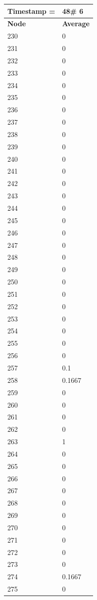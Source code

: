 \begin{tabular}{|l||l|}
\hline
\textbf{Timestamp =} & \textbf{48}\# 6\\\hline
	\textbf{Node} & \textbf{Average} \\ \hline
\hline
	230 & 0 \\ \hline
	231 & 0 \\ \hline
	232 & 0 \\ \hline
	233 & 0 \\ \hline
	234 & 0 \\ \hline
	235 & 0 \\ \hline
	236 & 0 \\ \hline
	237 & 0 \\ \hline
	238 & 0 \\ \hline
	239 & 0 \\ \hline
	240 & 0 \\ \hline
	241 & 0 \\ \hline
	242 & 0 \\ \hline
	243 & 0 \\ \hline
	244 & 0 \\ \hline
	245 & 0 \\ \hline
	246 & 0 \\ \hline
	247 & 0 \\ \hline
	248 & 0 \\ \hline
	249 & 0 \\ \hline
	250 & 0 \\ \hline
	251 & 0 \\ \hline
	252 & 0 \\ \hline
	253 & 0 \\ \hline
	254 & 0 \\ \hline
	255 & 0 \\ \hline
	256 & 0 \\ \hline
	257 & 0.1 \\ \hline
	258 & 0.1667 \\ \hline
	259 & 0 \\ \hline
	260 & 0 \\ \hline
	261 & 0 \\ \hline
	262 & 0 \\ \hline
	263 & 1 \\ \hline
	264 & 0 \\ \hline
	265 & 0 \\ \hline
	266 & 0 \\ \hline
	267 & 0 \\ \hline
	268 & 0 \\ \hline
	269 & 0 \\ \hline
	270 & 0 \\ \hline
	271 & 0 \\ \hline
	272 & 0 \\ \hline
	273 & 0 \\ \hline
	274 & 0.1667 \\ \hline
	275 & 0 \\ \hline
\end{tabular}

